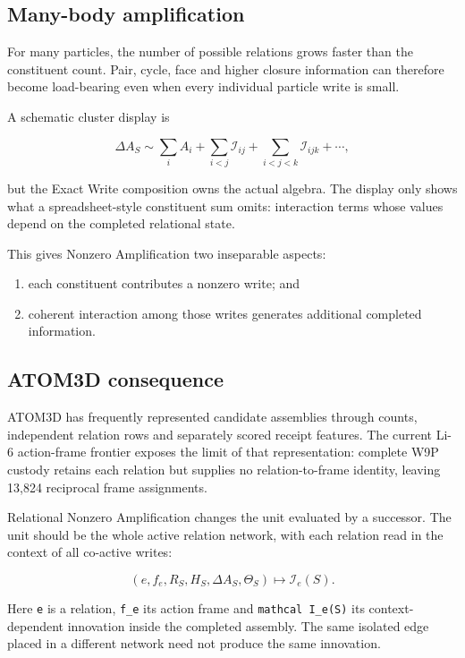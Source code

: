 \subsection{Many-body amplification}\label{viii-ch12-many-body-amplification}

For many particles, the number of possible relations grows faster than
the constituent count. Pair, cycle, face and higher closure information
can therefore become load-bearing even when every individual particle
write is small.

A schematic cluster display is

\[
\Delta A_S
\sim
\sum_i A_i
+\sum_{i<j}\mathcal I_{ij}
+\sum_{i<j<k}\mathcal I_{ijk}
+\cdots,
\]

but the Exact Write composition owns the actual algebra. The display
only shows what a spreadsheet-style constituent sum omits: interaction
terms whose values depend on the completed relational state.

This gives Nonzero Amplification two inseparable aspects:

\begin{enumerate}
\def\labelenumi{\arabic{enumi}.}
\tightlist
\item
  each constituent contributes a nonzero write; and
\item
  coherent interaction among those writes generates additional completed
  information.
\end{enumerate}

\subsection{ATOM3D consequence}\label{viii-ch12-atom3d-consequence}

ATOM3D has frequently represented candidate assemblies through counts,
independent relation rows and separately scored receipt features. The
current Li-6 action-frame frontier exposes the limit of that
representation: complete W9P custody retains each relation but supplies
no relation-to-frame identity, leaving 13,824 reciprocal frame
assignments.

Relational Nonzero Amplification changes the unit evaluated by a
successor. The unit should be the whole active relation network, with
each relation read in the context of all co-active writes:

\[
(e,f_e,R_S,H_S,\Delta A_S,\Theta_S)
\longmapsto
\mathcal I_e(S).
\]

Here \texttt{e} is a relation, \texttt{f\_e} its action frame and
\texttt{mathcal\ I\_e(S)} its context-dependent innovation inside the
completed assembly. The same isolated edge placed in a different network
need not produce the same innovation.

